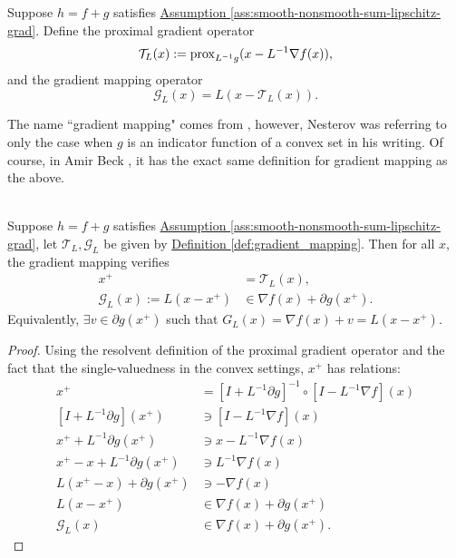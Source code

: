 \documentclass[12pt]{article}
\begin{document}
    \begin{definition}
        \label{def:gradient_mapping}
        Suppose $h = f + g$ satisfies 
        \hyperref[ass:smooth-nonsmooth-sum-lipschitz-grad]
        {Assumption \ref*{ass:smooth-nonsmooth-sum-lipschitz-grad}}. 
        Define the proximal gradient operator
        $$
            \mathcal T_L(x) := \operatorname{prox}_{L^{-1}g}(x - L^{-1}\nabla f(x)),
        $$
        and the gradient mapping operator
        $$
            \mathcal G_L(x) = L(x - \mathcal T_L(x)). 
        $$
    \end{definition}
    \begin{remark}
        The name ``gradient mapping" comes from \cite[(2.2.54)]{nesterov_lectures_2018}, however, Nesterov was referring to only the case when $g$ is an indicator function of a convex set in his writing. 
        Of course, in Amir Beck \cite[10.3.2]{beck_first-order_nodate}, it has the exact same definition for gradient mapping as the above. 
    \end{remark}

    \begin{lemma}
    \label{lemma:grad-map-approx-subgrad}\; \\
        Suppose $h = f + g$ satisfies 
        \hyperref[ass:smooth-nonsmooth-sum-lipschitz-grad]
        {Assumption \ref{ass:smooth-nonsmooth-sum-lipschitz-grad}}, 
        let $\mathcal T_L, \mathcal G_L$ be given by 
        \hyperref[def:gradient_mapping]{Definition \ref*{def:gradient_mapping}}.
        Then for all $x$, the gradient mapping verifies
        \begin{align*}
            x^+ &= \mathcal T_L(x), 
            \\
            \mathcal G_L(x) := L(x - x^+) &\in  \nabla f(x) + \partial g(x^+). 
        \end{align*}
        Equivalently, $\exists v \in \partial g(x^+)$ such that $G_L(x) = \nabla f(x) + v = L(x - x^+)$. 
    \end{lemma}
    \begin{proof}
        Using the resolvent definition of the proximal gradient operator and the fact that the single-valuedness in the convex settings, $x^+$ has relations: 
        \begin{align*}
            x^+ &= [I + L^{-1}\partial g]^{-1}\circ [I - L^{-1}\nabla f](x)
            \\
            [I + L^{-1}\partial g](x^+) &\ni [I - L^{-1}\nabla f](x)
            \\
            x^+ + L^{-1}\partial g(x^+) &\ni x - L^{-1}\nabla f(x)
            \\
            x^+ - x + L^{-1}\partial g(x^+) &\ni L^{-1}\nabla f(x)
            \\
            L(x^+ - x) + \partial g(x^+) &\ni - \nabla f(x)
            \\
            L(x - x^+) &\in \nabla f(x) + \partial g(x^+)
            \\
            \mathcal G_L(x) &\in \nabla f(x) + \partial g(x^+). 
        \end{align*}
    \end{proof}
\end{document}
